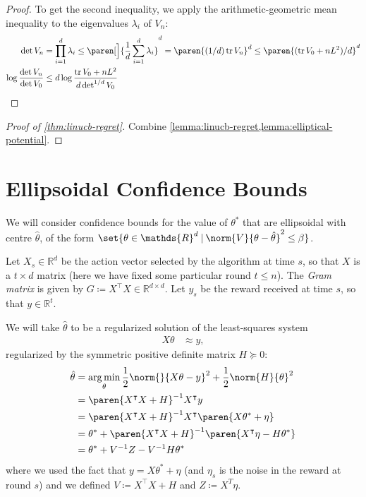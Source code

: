 \documentclass{article}
\newcommand{\defeq}{\coloneq}
\newcommand{\inv}[1]{#1^{-1}}
\newcommand{\Real}{\mathds{R}}
\DeclareMathOperator*{\argmin}{arg\,min}
\DeclareMathOperator{\tr}{tr}
\newcommand\given[1][\delimsize]{%
  \providecommand{\delimsize}{}
  \nonscript\:#1\vert\allowbreak\nonscript\:\mathopen{}
}
\DeclarePairedDelimiter{\paren}()
\DeclarePairedDelimiter{\set}\{\}
\newcommand{\transp}[1]{#1^\intercal}
\begin{document}
\begin{lemma}
\begin{proof}
    To get the second inequality, we apply the arithmetic-geometric
    mean inequality to the eigenvalues $\lambda_i$ of $V_n$:
    \begin{align*}
      \det V_n &= \prod_{i=1}^d \lambda_i
                \le \paren[\Big]{\frac{1}{d} \sum_{i=1}^d \lambda_i}^d
                = \paren{(1/d)\tr V_n}^d
                \le \paren{(\tr V_0 + nL^2)/d}^d \\
      \log\frac{\det V_n}{\det V_0}
              &\le d\log\frac{\tr V_0 + nL^2}{d\det^{1/d}V_0}
                \qedhere
    \end{align*}
  \end{proof}
\end{lemma}

\begin{proof}[Proof of \cref{thm:linucb-regret}]
  Combine \cref{lemma:linucb-regret,lemma:elliptical-potential}.
\end{proof}


\section{Ellipsoidal Confidence Bounds}
\label{sec:ellips-conf-bounds}

We will consider confidence bounds for the value of $\theta^*$ that are
ellipsoidal with centre $\hat{\theta}$, of the form
$\set{\theta\in\Real^d \given \norm{V}{\theta-\hat{\theta}}^2 \le
  \beta}$.

Let $X_s \in \Real^d$ be the action vector selected by the algorithm at
time $s$, so that $X$ is a $t \times d$ matrix (here we have fixed
some particular round $t \le n$).  The \emph{Gram matrix} is given by
$G \defeq \transp{X}X \in \Real^{d \times d}$.  Let $y_s$ be the reward
received at time $s$, so that $y\in\Real^t$.

We will take $\hat{\theta}$ to be a regularized solution of the
least-squares system
\begin{align*}
  X\theta &\approx y,
\end{align*}
regularized by the symmetric positive definite matrix $H \succeq 0$:
\begin{align*}
  \hat{\theta} &= \argmin_\theta \frac{1}{2}\norm{}{X\theta - y}^2 + \frac{1}{2}\norm{H}{\theta}^2 \\
               &= \inv{\paren{\transp{X}X + H}} \transp{X}y \\
               &= \inv{\paren{\transp{X}X + H}} \transp{X} \paren{X\theta^* + \eta} \\
               &= \theta^* + \inv{\paren{\transp{X}X + H}}\paren{\transp{X}\eta - H\theta^*} \\
               &= \theta^* + \inv{V}Z - \inv{V}H\theta^*
\end{align*}
where we used the fact that $y = X\theta^* + \eta$ (and $\eta_s$ is the
noise in the reward at round $s$) and we defined $V \defeq \transp{X}X
+ H$ and $Z\defeq X^T\eta$.
\end{document}
